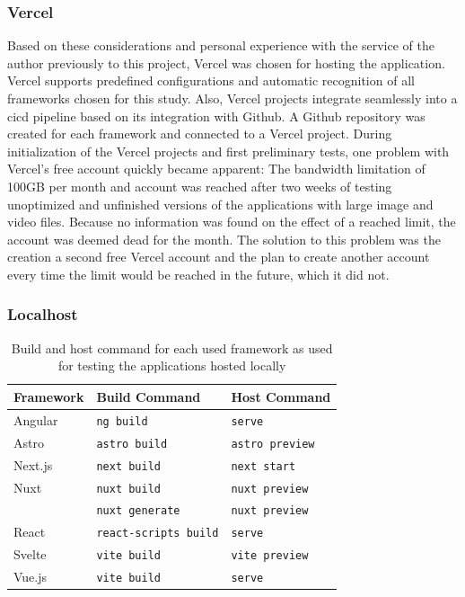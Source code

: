 \documentclass[a4paper, 12pt]{article}
\begin{document}
\subsubsection{Vercel}
Based on these considerations and personal experience with the service of the author previously to this project, Vercel was chosen for hosting the application.
Vercel supports predefined configurations and automatic recognition of all frameworks chosen for this study.
Also, Vercel projects integrate seamlessly into a \acrshort{cicd} pipeline based on its integration with Github.
A Github repository was created for each framework and connected to a Vercel project.
During initialization of the Vercel projects and first preliminary tests, one problem with Vercel's free account quickly became apparent:
The bandwidth limitation of 100GB per month and account was reached after two weeks of testing unoptimized and unfinished versions of the applications with large image and video files.
Because no information was found on the effect of a reached limit, the account was deemed dead for the month.
The solution to this problem was the creation a second free Vercel account and the plan to create another account every time the limit would be reached in the future, which it did not.

\subsubsection{Localhost}\label{subsubsec:localhost}
\begin{table}[h]
  \begin{center}
    \begin{tabular}[h]{| l | l | l |}
      \hline
      \textbf{Framework} & \textbf{Build Command} & \textbf{Host Command} \\ \hline
      Angular & \verb|ng build| & \verb|serve| \\ \hline
      Astro & \verb|astro build| & \verb|astro preview| \\ \hline
      Next.js & \verb|next build| & \verb|next start| \\ \hline
      Nuxt & \verb|nuxt build| & \verb|nuxt preview| \\
      & \verb|nuxt generate| & \verb|nuxt preview| \\ \hline
      React & \verb|react-scripts build| & \verb|serve| \\ \hline
      Svelte & \verb|vite build| & \verb|vite preview| \\ \hline
      Vue.js & \verb|vite build| & \verb|serve| \\ \hline
    \end{tabular}
  \end{center}
  \caption{Build and host command for each used framework as used for testing the applications hosted locally}\label{tab:hostCommands}
\end{table}
\end{document}
